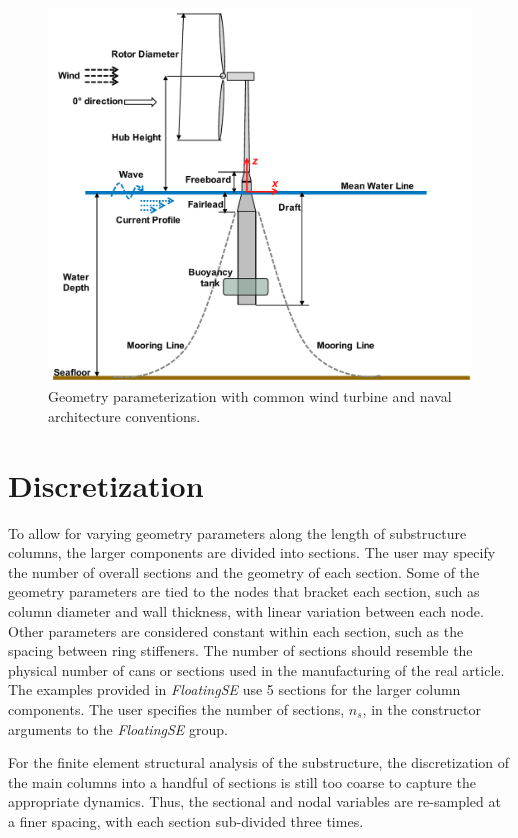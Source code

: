 \begin{figure}[htb]
  \begin{center}
    \includegraphics[width=5in]{figs/diagram.pdf}
    \caption{Geometry parameterization with common wind turbine and
      naval architecture conventions.}
    \label{fig:diagram}
  \end{center}
\end{figure}

\section{Discretization}
To allow for varying geometry parameters along the length of
substructure columns, the larger components are divided into sections.
The user may specify the number of overall sections and the geometry of
each section.  Some of the geometry parameters are tied to the nodes
that bracket each section, such as column diameter and wall thickness,
with linear variation between each node.  Other parameters are
considered constant within each section, such as the spacing between
ring stiffeners.  The number of sections should resemble the physical
number of cans or sections used in the manufacturing of the real
article.  The examples provided in \textit{FloatingSE} use 5 sections
for the larger column components.  The user specifies the number of
sections, $n_s$, in the constructor arguments to the \textit{FloatingSE}
group.

For the finite element structural analysis of the substructure, the
discretization of the main columns into a handful of sections is still
too coarse to capture the appropriate dynamics.  Thus, the sectional and
nodal variables are re-sampled at a finer spacing, with each section
sub-divided three times.

